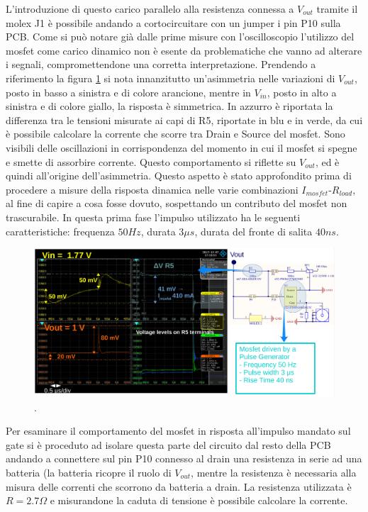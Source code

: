L'introduzione di questo carico parallelo alla resistenza connessa a $V_{out}$ tramite il molex J1 è possibile andando a cortocircuitare con un jumper i pin P10 sulla PCB. Come si può notare già dalle prime misure con l'oscilloscopio l'utilizzo del mosfet come carico dinamico non è esente da problematiche che vanno ad alterare i segnali, compromettendone una corretta interpretazione.
 Prendendo a riferimento la figura \ref{TransientTest} si nota innanzitutto un'asimmetria nelle variazioni di $V_{out}$, posto in basso a sinistra e di colore arancione, mentre in $V_{in}$, posto in alto a sinistra e di colore giallo, la risposta è simmetrica. In azzurro è riportata la differenza tra le tensioni misurate ai capi di R5, riportate in blu e in verde, da cui è possibile calcolare la corrente che scorre tra Drain e Source del mosfet. 
Sono visibili delle oscillazioni in corrispondenza del momento in cui il mosfet si spegne e smette di assorbire corrente. Questo comportamento si riflette su $V_{out}$, ed è quindi all'origine dell'asimmetria. Questo aspetto è stato approfondito prima di procedere a misure della risposta dinamica nelle varie combinazioni $I_{mosfet}$-$R_{load}$, al fine di capire a cosa fosse dovuto, sospettando un contributo del mosfet non trascurabile.
In questa prima fase l'impulso utilizzato ha le seguenti caratteristiche: frequenza $50 Hz$, durata $3 \mu s$, durata del fronte di salita $40 ns$.
\begin{figure}
\centering
\includegraphics[scale=.2]{Immagini/TransientTest}
\caption{.}
\label{TransientTest}
\end{figure}

Per esaminare il comportamento del mosfet in risposta all'impulso mandato sul gate si è proceduto ad isolare questa parte del circuito dal resto della PCB andando a connettere sul pin P10 connesso al drain una resistenza in serie ad una batteria (la batteria ricopre il ruolo di $V_{out}$, mentre la resistenza è necessaria alla misura delle correnti che scorrono da batteria a drain. La resistenza utilizzata è $R=2.7 \Omega$ e misurandone la caduta di tensione è possibile calcolare la corrente.

